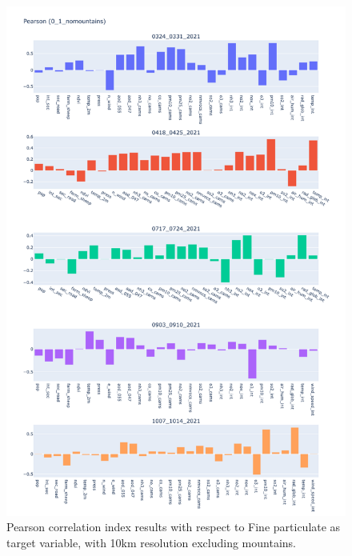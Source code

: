\begin{figure}[H]
    \centering
    \includegraphics[scale=0.35]{images/tests/0_1_nomountainspm25_st_pearson.png}
    \caption{Pearson correlation index results with respect to Fine particulate as target variable, with 10km resolution excluding mountains.}
    \label{fig:overview}
\end{figure}
